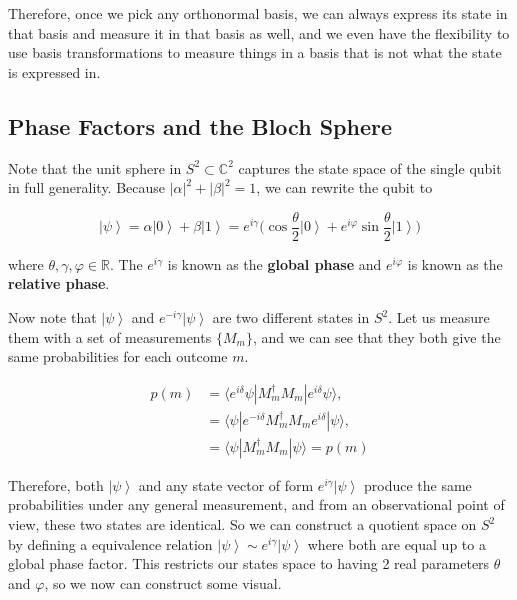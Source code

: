 \documentclass{article}
\newcommand{\ket}[1]{\ensuremath{\left|#1\right\rangle}}
\begin{document}
    Therefore, once we pick any orthonormal basis, we can always express its state in that basis and measure it in that basis as well, and we even have the flexibility to use basis transformations to measure things in a basis that is not what the state is expressed in. 

  \subsection{Phase Factors and the Bloch Sphere}

    \begin{definition}
      Note that the unit sphere in $S^2 \subset \mathbb{C}^2$ captures the state space of the single qubit in full generality. Because $|\alpha|^2 + |\beta|^2 = 1$, we can rewrite the qubit to 

      \begin{equation}
        \ket{\psi} = \alpha \ket{0} + \beta \ket{1} = e^{i \gamma} \bigg( \cos{\frac{\theta}{2}} \ket{0} + e^{i \varphi} \sin{\frac{\theta}{2}} \ket{1} \bigg) 
        \label{eq:global_phase}
      \end{equation}

      where $\theta, \gamma, \varphi \in \mathbb{R}$. The $e^{i \gamma}$ is known as the \textbf{global phase} and $e^{i \varphi}$ is known as the \textbf{relative phase}. 
    \end{definition}

    Now note that $\ket{\psi}$ and $e^{- i \gamma} \ket{\psi}$ are two different states in $S^2$. Let us measure them with a set of measurements $\{M_m\}$, and we can see that they both give the same probabilities for each outcome $m$. 
    
    \begin{align*}
      p(m) & = \langle e^{i \delta} \psi | M_m^\dagger M_m | e^{i \delta} \psi \rangle, \\
      & = \langle \psi | e^{-i \delta} M_m^\dagger M_m e^{i \delta} | \psi \rangle, \\
      & = \langle \psi | M_m^\dagger M_m | \psi \rangle = p(m)
    \end{align*}

    Therefore, both $\ket{\psi}$ and any state vector of form $e^{i \gamma} \ket{\psi}$ produce the same probabilities under any general measurement, and from an observational point of view, these two states are identical. So we can construct a quotient space on $S^2$ by defining a equivalence relation $\ket{\psi} \sim e^{i\gamma} \ket{\psi}$ where both are equal up to a global phase factor. This restricts our states space to having 2 real parameters $\theta$ and $\varphi$, so we now can construct some visual. 
\end{document}
